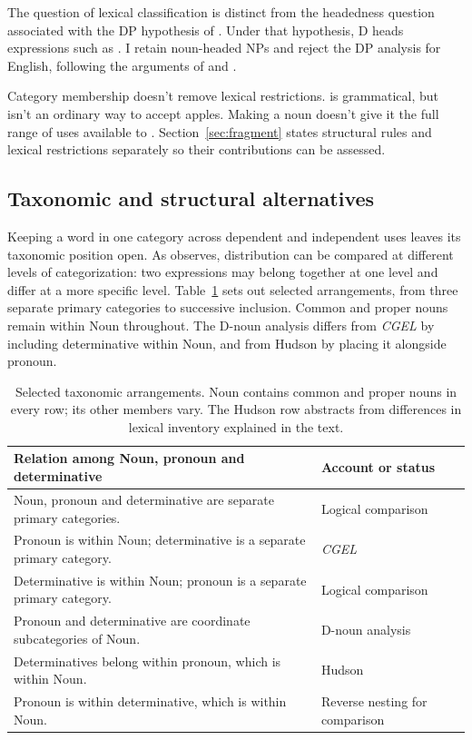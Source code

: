 \documentclass[12pt]{article}
\begin{document}
The question of lexical classification is distinct from the headedness question associated with the DP hypothesis of \textcite{abney1987}. Under that hypothesis, D heads expressions such as . I retain noun-headed NPs and reject the DP analysis for English, following the arguments of \textcite{pullummiller2022nps} and \textcite{bruening2020nominal}.

Category membership doesn't remove lexical restrictions.  is grammatical, but  isn't an ordinary way to accept apples. Making  a noun doesn't give it the full range of uses available to . Section~\ref{sec:fragment} states structural rules and lexical restrictions separately so their contributions can be assessed.

\subsection{Taxonomic and structural alternatives}\label{sec:related}

Keeping a word in one category across dependent and independent uses leaves its taxonomic position open. As \textcite[232--235]{lyons1968} observes, distribution can be compared at different levels of categorization: two expressions may belong together at one level and differ at a more specific level. Table~\ref{tab:rivals} sets out selected arrangements, from three separate primary categories to successive inclusion. Common and proper nouns remain within Noun throughout. The D-noun analysis differs from \textit{CGEL} by including determinative within Noun, and from Hudson by placing it alongside pronoun.

\begin{table}[H]
\centering\small
\caption{Selected taxonomic arrangements. Noun contains common and proper nouns in every row; its other members vary. The Hudson row abstracts from differences in lexical inventory explained in the text.}\label{tab:rivals}
\begin{tabular}{>{\raggedright\arraybackslash}p{8.7cm}>{\raggedright\arraybackslash}p{3cm}}
\toprule
Relation among Noun, pronoun and determinative & Account or status \\
\midrule
Noun, pronoun and determinative are separate primary categories. & Logical comparison \\
Pronoun is within Noun; determinative is a separate primary category. & \textit{CGEL} \\
Determinative is within Noun; pronoun is a separate primary category. & Logical comparison \\
Pronoun and determinative are coordinate subcategories of Noun. & D-noun analysis \\
Determinatives belong within pronoun, which is within Noun. & Hudson \\
Pronoun is within determinative, which is within Noun. & Reverse nesting for comparison \\
\bottomrule
\end{tabular}
\end{table}
\end{document}
